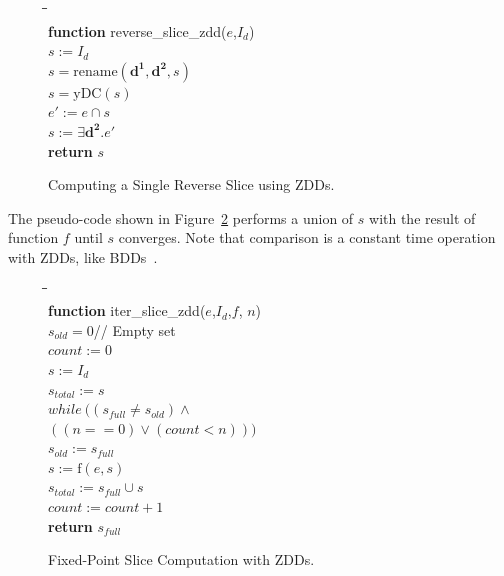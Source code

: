 \documentclass[defaultstyle,11pt]{thesis}
\begin{document}
\begin{figure}
\begin{center}
\begin{minipage}{1.5in}
\begin{tabbing}
\hspace{1em}\=\hspace{1em}\=\hspace{1em}\=\hspace{1em}\=\\
\textbf{function} reverse\_slice\_zdd($e$,$I_d$)\\
\>$s := I_d$\\
\>$s = \mathrm{rename}(\mathbf{d^1},\mathbf{d^2},s)$\\
\>$s = \mathrm{yDC}(s)$\\
\>$e' := e \cap s$\\
\>$s := \exists \mathbf{d^2}.e'$\\
\>\textbf{return} $s$
\end{tabbing}
\end{minipage}
\end{center}
\caption{Computing a Single Reverse Slice using ZDDs.}
\label{fig:zddslice}
\end{figure}

The pseudo-code shown in Figure~\ref{fig:zdditerslice} performs a
union of $s$ with the result of function $f$ until $s$ converges.
Note that comparison is a constant time operation with ZDDs, like
BDDs~\cite{bryant:86:ieeetc}.

\begin{figure}
\begin{center}
\begin{minipage}{1.5in}
\begin{tabbing}
\hspace{1em}\=\hspace{1em}\=\hspace{1em}\=\hspace{1em}\=\\
\textbf{function} iter\_slice\_zdd($e$,$I_d$,$f$, $n$)\\
\>$s_{old} = 0$// Empty set\\
\>$count :=0$\\
\>$s := I_d$\\
\>$s_{total} := s$\\
\>$while\ ((s_{full} \neq s_{old}) \wedge$ \\
\>\>\>\>$((n == 0) \vee (count < n))) $\\
\>\>$s_{old} := s_{full}$\\
\>\>$s := \mathrm{f}(e,s)$\\
\>\>$s_{total} := s_{full} \cup s$\\
\>\>$count := count + 1$\\
\>\textbf{return} $s_{full}$
\end{tabbing}
\end{minipage}
\end{center}
\caption{Fixed-Point Slice Computation with ZDDs.}
\label{fig:zdditerslice}
\end{figure}
\end{document}
